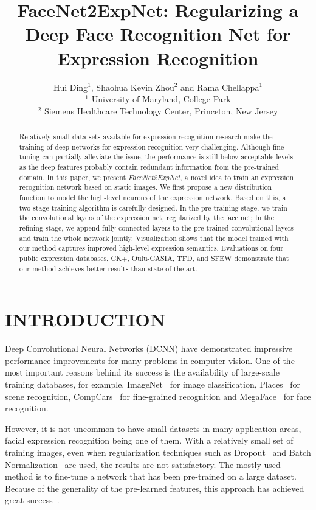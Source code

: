 \documentclass[a4paper, 10pt, conference]{ieeeconf}      %
\title{\LARGE \bf
FaceNet2ExpNet: Regularizing a Deep Face Recognition Net for Expression Recognition
}
\author{\parbox{16cm}{\centering
    {\large Hui Ding$^1$, Shaohua Kevin Zhou$^2$ and Rama Chellappa$^1$}\\
    {\normalsize
    $^{1}$ University of Maryland, College Park\\
    $^2$ Siemens Healthcare Technology Center, Princeton, New Jersey}}
}
\begin{document}
\ifFGfinal
\thispagestyle{empty}
\pagestyle{empty}
\else
\pagestyle{plain}
\fi
\maketitle



\begin{abstract}
Relatively small data sets available for expression recognition research make the training of deep networks  for expression recognition very challenging. Although fine-tuning can partially alleviate the issue, the performance is still below acceptable levels as the deep features probably contain redundant information from the pre-trained domain.
In this paper, we present \emph{FaceNet2ExpNet}, a novel idea to train an expression recognition network based on static images. We first propose a new distribution function to model the high-level neurons of the expression network. 
Based on this, a two-stage training algorithm is carefully designed. In the pre-training stage, we train the convolutional layers of the expression net, regularized by the face net; In the refining stage, we append fully-connected layers to the pre-trained convolutional layers and train the whole network jointly.
Visualization shows that the model trained with our method captures improved high-level expression semantics.
Evaluations on four public expression databases, CK+, Oulu-CASIA, TFD, and SFEW demonstrate that our method achieves better results than state-of-the-art. 
\end{abstract}


\section{INTRODUCTION}
Deep Convolutional Neural Networks (DCNN) have demonstrated impressive performance improvements for many problems in computer vision. One of the most important reasons behind its success is the availability of large-scale training databases, for example, ImageNet~\cite{imagenet_cvpr09} for image classification, Places~\cite{zhou2014learning} for scene recognition, CompCars~\cite{yang2015large} for fine-grained recognition and MegaFace~\cite{kemelmacher2015megaface} for face recognition. 

However, it is not uncommon to have small datasets in many application areas, facial expression recognition being one of them. With a relatively small set of training images, even when regularization techniques such as Dropout~\cite{srivastava2014dropout} and Batch Normalization~\cite{ioffe2015batch} are used, the results are not satisfactory. The mostly used method is to fine-tune a network that has been pre-trained on a large dataset. Because of the generality of the pre-learned features, this approach has achieved great success~\cite{girshick2014rich}. 
\end{document}
